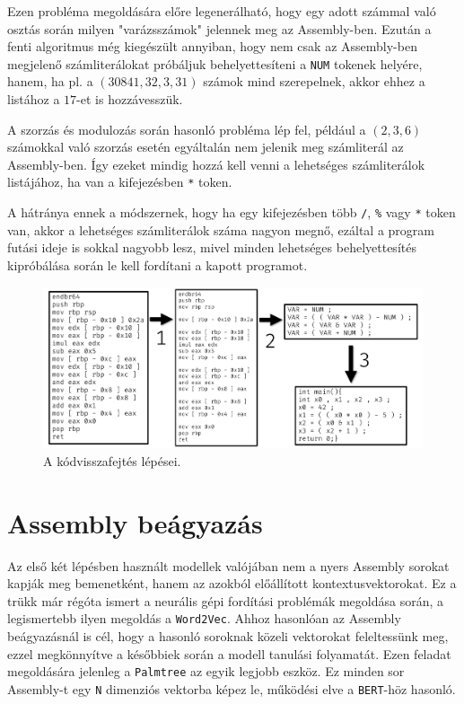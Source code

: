 Ezen probléma megoldására előre legenerálható, hogy egy adott számmal való
osztás során milyen "varázsszámok" jelennek meg az Assembly-ben. Ezután a fenti
algoritmus még kiegészült annyiban, hogy nem csak az Assembly-ben
megjelenő számliterálokat próbáljuk behelyettesíteni a \texttt{NUM} tokenek
helyére, hanem, ha pl. a $(30841, 32, 3, 31)$ számok mind szerepelnek, akkor ehhez a listához
a $17$-et is hozzávesszük.

A szorzás és modulozás során hasonló probléma lép fel, például a $(2, 3, 6)$
számokkal való szorzás esetén egyáltalán nem jelenik meg számliterál az
Assembly-ben. Így ezeket mindig hozzá kell venni a lehetséges számliterálok
listájához, ha van a kifejezésben \texttt{*} token.

A hátránya ennek a módszernek, hogy ha egy kifejezésben több \texttt{/},
\texttt{\%} vagy \texttt{*} token van, akkor a lehetséges számliterálok száma
nagyon megnő, ezáltal a program futási ideje is sokkal nagyobb lesz, mivel
minden lehetséges behelyettesítés kipróbálása során le kell fordítani
a kapott programot.

\begin{figure}[H]
	\centering
	\includegraphics[width=1\textwidth]{images/steps.pdf}
	\caption{A kódvisszafejtés lépései.}
	\label{fig:steps}
\end{figure}

\section{Assembly beágyazás}
Az első két lépésben használt modellek valójában nem a nyers Assembly sorokat
kapják meg bemenetként, hanem az azokból előállított kontextusvektorokat. Ez
a trükk már régóta ismert a neurális gépi fordítási problémák megoldása során,
a legismertebb ilyen megoldás a \texttt{Word2Vec}\cite{word2vec}. Ahhoz hasonlóan az
Assembly beágyazásnál is cél, hogy a hasonló soroknak közeli vektorokat
feleltessünk meg, ezzel megkönnyítve a későbbiek során a modell tanulási
folyamatát. Ezen feladat megoldására jelenleg a \texttt{Palmtree}\cite{palmtree} az egyik legjobb eszköz.
Ez minden sor Assembly-t egy \texttt{N} dimenziós vektorba képez le, működési elve
a \texttt{BERT}\cite{bert}-höz hasonló.
